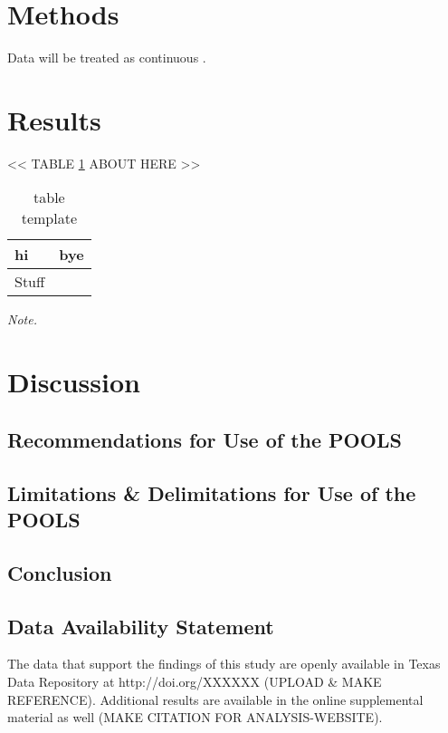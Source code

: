 \documentclass[man, noextraspace, floatsintext, 12pt]{apa7}
\begin{document}
\section{Methods}

Data will be treated as continuous \citep{Rhemtulla2012}.


\section{Results}



<< TABLE \ref{tb:ex} ABOUT HERE >>


\begin{table}[ht]
 \centering
 \begin{threeparttable}
 \caption{table template} 
 \label{tb:ex}
\begin{tabular}{lr}
  \toprule
hi & bye \\ 
  \midrule
  Stuff
   \bottomrule
\end{tabular}
 \vspace*{1mm}
 	\begin{tablenotes}
    {\small
        \textit{Note.} 
    }
 	\end{tablenotes}
 \end{threeparttable}
\end{table}
 



\section{Discussion}



\subsection{Recommendations for Use of the POOLS}



\subsection{Limitations \& Delimitations for Use of the POOLS}



\subsection{Conclusion}


\subsection{Data Availability Statement}
The data that support the findings of this study are openly available in Texas Data Repository at http://doi.org/XXXXXX (UPLOAD \& MAKE REFERENCE).
Additional results are available in the online supplemental material as well (MAKE CITATION FOR ANALYSIS-WEBSITE).
\end{document}
